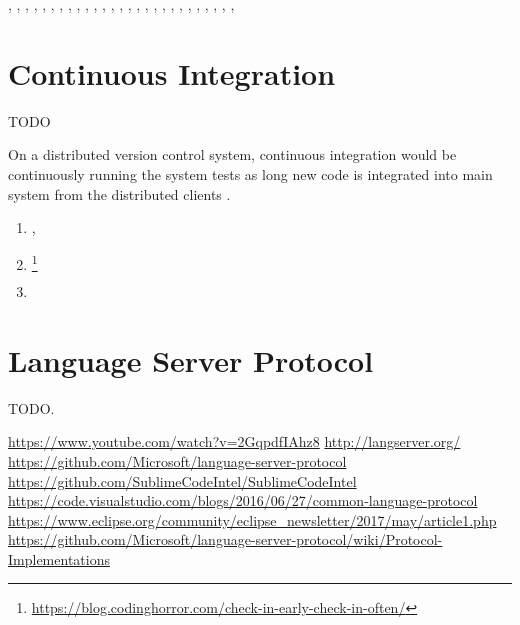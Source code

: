     ,
    ,
    ,
    ,
    ,
    ,
    ,
    ,
    ,
    ,
    ,
    ,
    ,
    ,
    ,
    ,
    ,
    ,
    ,
    ,
    ,
    ,
    ,
    ,
    ,
    ,
    ,



    \section{Continuous Integration}

    TODO

    On a distributed version control system,
    continuous integration would be continuously running the system tests
    as long new code is integrated into main system
    from the distributed clients \cite{continuousIntegration}.

    \begin{enumerate}[leftmargin=*]
        \item {},
        \item \footnote{\url{https://blog.codinghorror.com/check-in-early-check-in-often/}}
        \item \cite{aspectOriented}
    \end{enumerate}



    \section{Language Server Protocol}

    TODO.

    \url{https://www.youtube.com/watch?v=2GqpdfIAhz8}
    \url{http://langserver.org/}
    \url{https://github.com/Microsoft/language-server-protocol}
    \url{https://github.com/SublimeCodeIntel/SublimeCodeIntel}
    \url{https://code.visualstudio.com/blogs/2016/06/27/common-language-protocol}
    \url{https://www.eclipse.org/community/eclipse_newsletter/2017/may/article1.php}
    \url{https://github.com/Microsoft/language-server-protocol/wiki/Protocol-Implementations}
